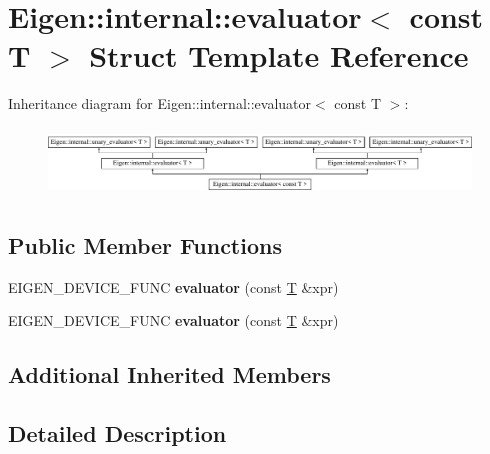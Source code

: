 \hypertarget{struct_eigen_1_1internal_1_1evaluator_3_01const_01_t_01_4}{}\section{Eigen\+:\+:internal\+:\+:evaluator$<$ const T $>$ Struct Template Reference}
\label{struct_eigen_1_1internal_1_1evaluator_3_01const_01_t_01_4}
Inheritance diagram for Eigen\+:\+:internal\+:\+:evaluator$<$ const T $>$\+:\begin{figure}[H]
\begin{center}
\leavevmode
\includegraphics[height=1.826087cm]{struct_eigen_1_1internal_1_1evaluator_3_01const_01_t_01_4}
\end{center}
\end{figure}
\subsection*{Public Member Functions}
\begin{DoxyCompactItemize}
\item 
\mbox{\label{struct_eigen_1_1internal_1_1evaluator_3_01const_01_t_01_4_ab7b217b5a318a376939af2b53fd2728b}} 
E\+I\+G\+E\+N\+\_\+\+D\+E\+V\+I\+C\+E\+\_\+\+F\+U\+NC {\bfseries evaluator} (const \hyperlink{group___sparse_core___module}{T} \&xpr)
\item 
\mbox{\label{struct_eigen_1_1internal_1_1evaluator_3_01const_01_t_01_4_ab7b217b5a318a376939af2b53fd2728b}} 
E\+I\+G\+E\+N\+\_\+\+D\+E\+V\+I\+C\+E\+\_\+\+F\+U\+NC {\bfseries evaluator} (const \hyperlink{group___sparse_core___module}{T} \&xpr)
\end{DoxyCompactItemize}
\subsection*{Additional Inherited Members}


\subsection{Detailed Description}
